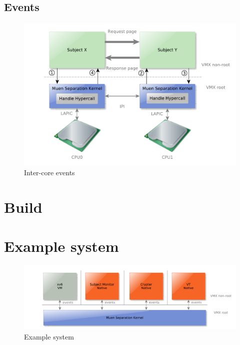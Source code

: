 \subsection{Events}
\begin{figure}[h]
	\centering
	\includegraphics[width=\textwidth]{images/inter-core-events}
	\caption{Inter-core events}
	\label{fig:inter-core-events}
\end{figure}
\section{Build}
\section{Example system}
\begin{figure}[h]
	\centering
	\includegraphics[width=\textwidth]{images/architecture-example_system}
	\caption{Example system}
	\label{fig:example-system}
\end{figure}
